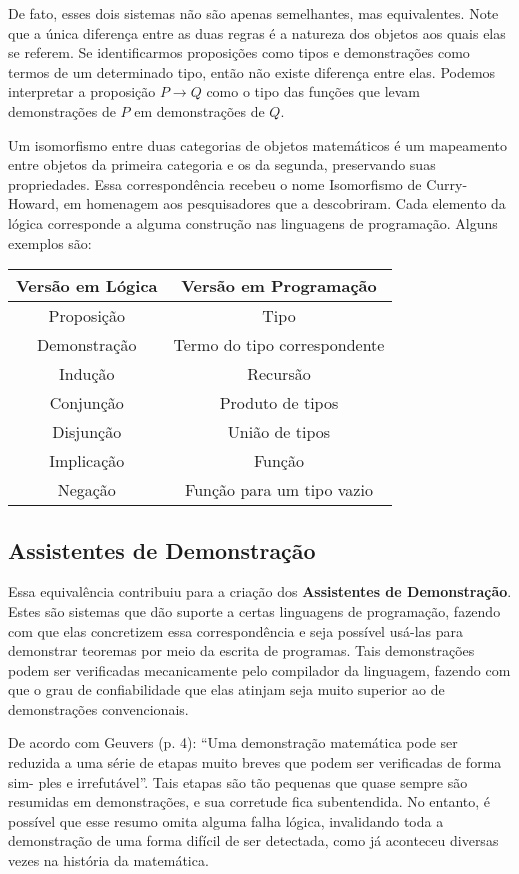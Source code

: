 \documentclass[12pt, oneside, a4paper,english,brazil]{abntex2}
\begin{document}
\qquad De fato, esses dois sistemas não são apenas semelhantes, mas equivalentes. Note
que a única diferença entre as duas regras é a natureza dos objetos aos quais elas se referem.
Se identificarmos proposições como tipos e demonstrações como termos de um determinado
tipo, então não existe diferença entre elas. Podemos interpretar a proposição $P \rightarrow Q$ como
o tipo das funções que levam demonstrações de $P$ em demonstrações de $Q$.

\qquad Um isomorfismo entre duas categorias de objetos matemáticos é um mapeamento
entre objetos da primeira categoria e os da segunda, preservando suas propriedades.
Essa correspondência recebeu o nome Isomorfismo de Curry-Howard, em homenagem
aos pesquisadores que a descobriram. Cada elemento da lógica corresponde a alguma
construção nas linguagens de programação. Alguns exemplos são:
\begin{table}[H]
  \centering
    \begin{tabular}{cc}\toprule
      Versão em Lógica & Versão em Programação  \\\midrule
      Proposição & Tipo \\
      Demonstração & Termo do tipo correspondente \\
      Indução & Recursão \\
      Conjunção & Produto de tipos \\
      Disjunção & União de tipos \\
      Implicação & Função \\
      Negação & Função para um tipo vazio \\\bottomrule
    \end{tabular}
\end{table}

\subsection*{Assistentes de Demonstra\c{c}\~ao}
\qquad Essa equivalência contribuiu para a cria\c{c}\~ao dos \textbf{Assistentes de Demonstra\c{c}\~ao}. Estes
são sistemas que dão suporte a certas linguagens de programação, fazendo com que elas
concretizem essa correspondência e seja possível usá-las para demonstrar teoremas por
meio da escrita de programas. Tais demonstrações podem ser verificadas mecanicamente
pelo compilador da linguagem, fazendo com que o grau de confiabilidade que elas atinjam
seja muito superior ao de demonstrações convencionais.

\qquad De acordo com Geuvers\cite{geuvers} (p. 4): ``Uma demonstração matemática pode ser
reduzida a uma série de etapas muito breves que podem ser verificadas de forma sim-
ples e irrefutável''. Tais etapas são tão pequenas que quase sempre são resumidas em
demonstrações, e sua corretude fica subentendida. No entanto, é possível que esse resumo
omita alguma falha lógica, invalidando toda a demonstração de uma forma difícil de ser
detectada, como j\'a aconteceu diversas vezes na hist\'oria da matem\'atica.
\end{document}
